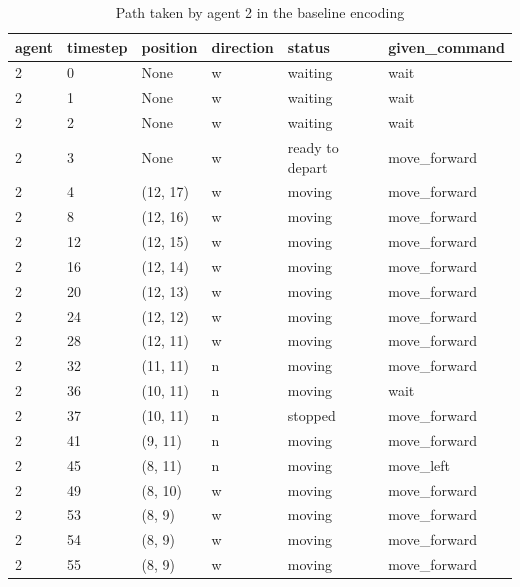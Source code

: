 \documentclass[12pt, a4paper]{llncs}
\begin{document}
\begin{table}[htbp]
  \centering
  \caption{Path taken by agent 2 in the baseline encoding}
  \label{tab:baseline2}
  \begin{tabular}{llllll}
    \toprule
    agent & timestep & position & direction & status & given\_command \\
    \midrule
2 & 0 & None & w & waiting & wait \\
2 & 1 & None & w & waiting & wait \\
2 & 2 & None & w & waiting & wait \\
2 & 3 & None & w & ready to depart & move\_forward \\
2 & 4 & (12, 17) & w & moving & move\_forward \\
2 & 8 & (12, 16) & w & moving & move\_forward \\
2 & 12 & (12, 15) & w & moving & move\_forward \\
2 & 16 & (12, 14) & w & moving & move\_forward \\
2 & 20 & (12, 13) & w & moving & move\_forward \\
2 & 24 & (12, 12) & w & moving & move\_forward \\
2 & 28 & (12, 11) & w & moving & move\_forward \\
2 & 32 & (11, 11) & n & moving & move\_forward \\
2 & 36 & (10, 11) & n & moving & wait \\
2 & 37 & (10, 11) & n & stopped & move\_forward \\
2 & 41 & (9, 11) & n & moving & move\_forward \\
2 & 45 & (8, 11) & n & moving & move\_left \\
2 & 49 & (8, 10) & w & moving & move\_forward \\
2 & 53 & (8, 9) & w & moving & move\_forward \\
2 & 54 & (8, 9) & w & moving & move\_forward \\
2 & 55 & (8, 9) & w & moving & move\_forward \\
    \bottomrule
  \end{tabular}
\end{table}
\end{document}
